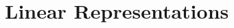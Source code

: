 \documentclass[openany, amssymb, psamsfonts]{amsart}
\theoremstyle{definition}
\numberwithin{equation}{section}
\begin{document}
\section{Linear Representations}
\end{document}
